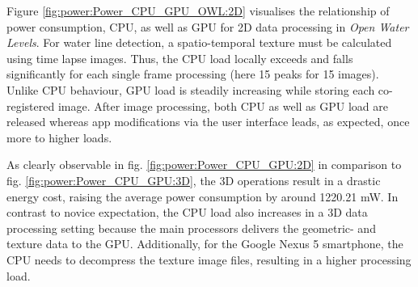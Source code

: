 \documentclass[review]{elsarticle}
\begin{document}

Figure \ref{fig:power:Power_CPU_GPU_OWL:2D} visualises the relationship of power consumption, \gls{CPU}, as well as \gls{GPU} for 2D data processing in \textit{Open Water Levels}. For water line detection, a spatio-temporal texture must be calculated using time lapse images. Thus, the CPU load locally exceeds and falls significantly for each single frame processing (here 15 peaks for 15 images). Unlike \gls{CPU} behaviour, \gls{GPU} load is steadily increasing while storing each co-registered image. After image processing, both \gls{CPU} as well as \gls{GPU} load are released whereas app modifications via the user interface leads, as expected, once more to higher loads.

As clearly observable in fig. \ref{fig:power:Power_CPU_GPU:2D} in comparison to fig. \ref{fig:power:Power_CPU_GPU:3D}, the 3D operations result in a drastic energy cost, raising the average power consumption by around 1220.21 mW. In contrast to novice expectation, the \gls{CPU} load also increases in a 3D data processing setting because the main processors delivers the geometric- and texture data to the \gls{GPU}. Additionally, for the Google Nexus 5 smartphone, the \gls{CPU} needs to decompress the texture image files, resulting in a higher processing load.

\end{document}
